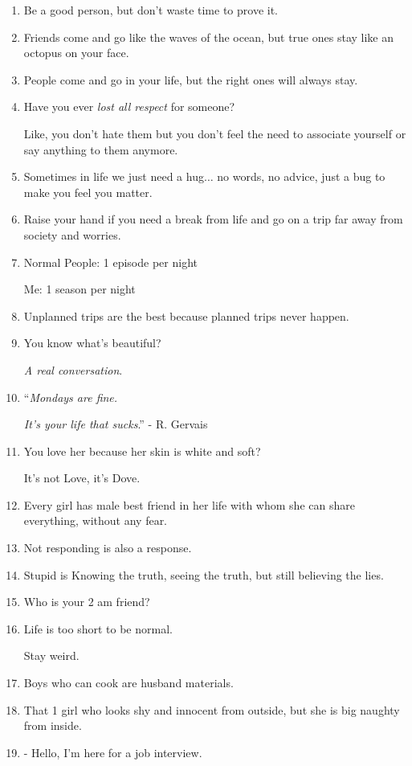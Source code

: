 \documentclass{article}
\numberwithin{equation}{section}
\begin{document}
\begin{enumerate}
    ``To do is to be.'' - Kant
    
    ``Do be do be do'' - Scooby Doo
    \item Be a good person, but don't waste time to prove it.
    \item Friends come and go like the waves of the ocean, but true ones stay like an octopus on your face.
    \item People come and go in your life, but the right ones will always stay.
    \item Have you ever \textit{lost all respect} for someone?
    
    Like, you don't hate them but you don't feel the need to associate yourself or say anything to them anymore.
    \item Sometimes in life we just need a hug$\ldots$ no words, no advice, just a bug to make you feel you matter.
    \item Raise your hand if you need a break from life and go on a trip far away from society and worries.
    \item Normal People: 1 episode per night
    
    Me: 1 season per night
    \item Unplanned trips are the best because planned trips never happen.
    \item You know what's beautiful?
    
    \textit{A real conversation}.
    \item ``\textit{Mondays are fine.}
    
    \textit{It's your life that sucks}.'' - R. Gervais
    \item You love her because her skin is white and soft?
    
    It's not Love, it's Dove.
    \item Every girl has male best friend in her life with whom she can share everything, without any fear.
    \item Not responding is also a response.
    \item Stupid is Knowing the truth, seeing the truth, but still believing the lies.
    \item Who is your 2 am friend?
    \item Life is too short to be normal.
    
    Stay weird.
    \item Boys who can cook are husband materials.
    \item That 1 girl who looks shy and innocent from outside, but she is big naughty from inside.
    \item - Hello, I'm here for a job interview.
    

\end{enumerate}
\end{document}
